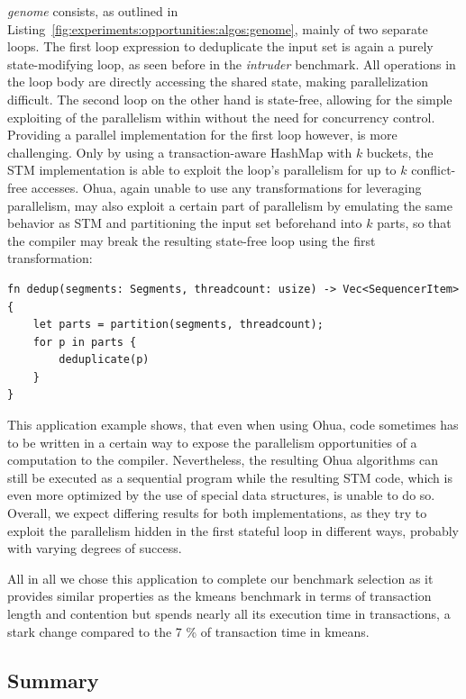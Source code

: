 \emph{genome} consists, as outlined in Listing~\ref{fig:experiments:opportunities:algos:genome}, mainly of two separate loops.
The first loop expression to deduplicate the input set is again a purely state-modifying loop, as seen before in the \emph{intruder} benchmark.
All operations in the loop body are directly accessing the shared state, making parallelization difficult.
The second loop on the other hand is state-free, allowing for the simple exploiting of the parallelism within without the need for concurrency control.\\
Providing a parallel implementation for the first loop however, is more challenging.
Only by using a transaction-aware HashMap with $k$ buckets, the STM implementation is able to exploit the loop's parallelism for up to $k$ conflict-free accesses.
Ohua, again unable to use any transformations for leveraging parallelism, may also exploit a certain part of parallelism by emulating the same behavior as STM and partitioning the input set beforehand into $k$ parts, so that the compiler may break the resulting state-free loop using the first transformation:
\begin{verbatim}
fn dedup(segments: Segments, threadcount: usize) -> Vec<SequencerItem> {
    let parts = partition(segments, threadcount);
    for p in parts {
        deduplicate(p)
    }
}
\end{verbatim}
This application example shows, that even when using Ohua, code sometimes has to be written in a certain way to expose the parallelism opportunities of a computation to the compiler.
Nevertheless, the resulting Ohua algorithms can still be executed as a sequential program while the resulting STM code, which is even more optimized by the use of special data structures, is unable to do so.
Overall, we expect differing results for both implementations, as they try to exploit the parallelism hidden in the first stateful loop in different ways, probably with varying degrees of success.

All in all we chose this application to complete our benchmark selection as it provides similar properties as the kmeans benchmark in terms of transaction length and contention but spends nearly all its execution time in transactions, a stark change compared to the 7 \% of transaction time in kmeans.

\subsection{Summary}
\label{sec:experiments:opportunity-summary}


